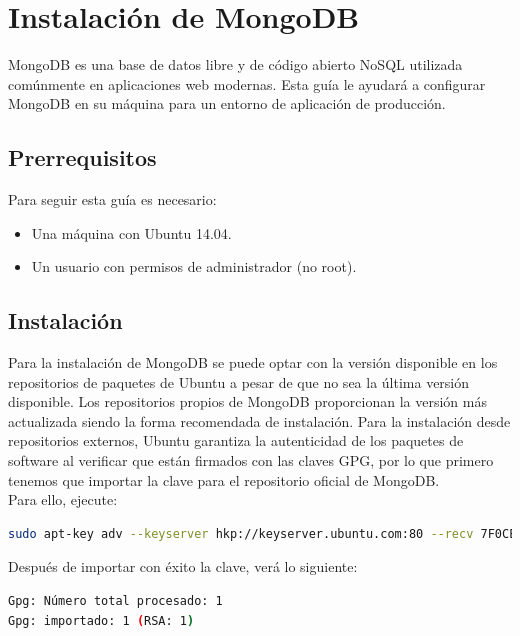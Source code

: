 \section{Instalación de MongoDB}

MongoDB es una base de datos libre y de código abierto NoSQL utilizada comúnmente en aplicaciones web modernas. Esta guía le ayudará a configurar MongoDB en su máquina para un entorno de aplicación de producción.\\

\subsection{Prerrequisitos}

Para seguir esta guía es necesario:
\begin{itemize}

\item{Una máquina con Ubuntu 14.04.}
\item{Un usuario con permisos de administrador (no root).}
\end{itemize}

\subsection{Instalación}


Para la instalación de MongoDB se puede optar con la versión disponible en los repositorios de paquetes de Ubuntu a pesar de que no sea la última versión disponible. Los repositorios propios de MongoDB proporcionan
la versión más actualizada siendo la forma recomendada de instalación. Para la instalación desde repositorios externos, Ubuntu garantiza la autenticidad de los paquetes de software al verificar que están firmados
con las claves GPG, por lo que primero tenemos que importar la clave para el repositorio oficial de MongoDB.\\

Para ello, ejecute:\\

\begin{lstlisting}[language=bash]
sudo apt-key adv --keyserver hkp://keyserver.ubuntu.com:80 --recv 7F0CEB10
\end{lstlisting}


Después de importar con éxito la clave, verá lo siguiente:\\

\begin{lstlisting}[language=bash]
Gpg: Número total procesado: 1
Gpg: importado: 1 (RSA: 1)
\end{lstlisting}

